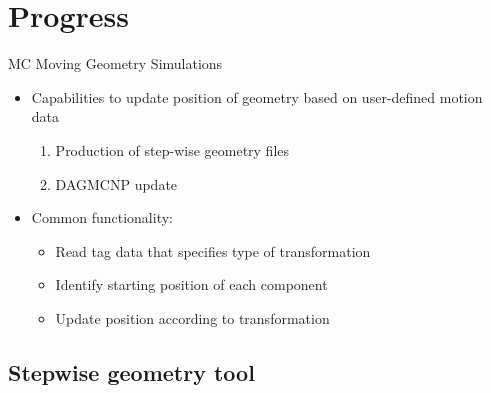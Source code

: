 \documentclass{beamer}
\begin{document}
\section{Progress}
\begin{frame}{MC Moving Geometry Simulations}
	\begin{itemize}
		\item{Capabilities to update position of geometry based on
			user-defined motion data}
			\begin{enumerate}
				\item{Production of step-wise geometry files}
				\item{DAGMCNP update}
			\end{enumerate}
		\item{Common functionality:}
			\begin{itemize}
				\item{%
					Read tag data that specifies 
					type of transformation}
				\item{Identify starting position of each
					component}
				\item{Update position according to
					transformation}
			\end{itemize}
	\end{itemize}
\end{frame}
\subsection{Stepwise geometry tool}
\end{document}
